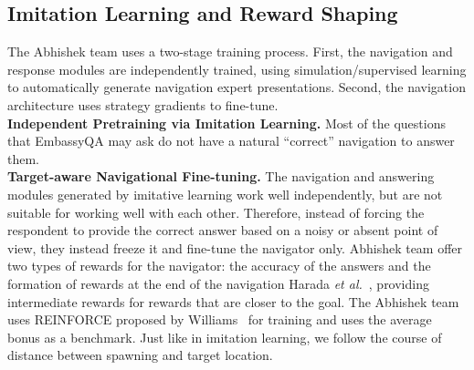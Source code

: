 \documentclass[10pt,twocolumn,letterpaper]{article}
\begin{document}
        \subsection{Imitation Learning and Reward Shaping}
        The Abhishek team uses a two-stage training process. First, the navigation and response modules are independently trained, using simulation/supervised learning to automatically generate navigation expert presentations. Second, the navigation architecture uses strategy gradients to fine-tune. \\
        \textbf{Independent Pretraining via Imitation Learning.} Most of the questions that EmbassyQA may ask do not have a natural ``correct'' navigation to answer them. \\
        \textbf{Target-aware Navigational Fine-tuning.} The navigation and answering modules generated by imitative learning work well independently, but are not suitable for working well with each other. Therefore, instead of forcing the respondent to provide the correct answer based on a noisy or absent point of view, they instead freeze it and fine-tune the navigator only. Abhishek team offer two types of rewards for the navigator: the accuracy of the answers and the formation of rewards at the end of the navigation Harada \emph{et al.}~\cite{[5]}, providing intermediate rewards for rewards that are closer to the goal. The Abhishek team uses REINFORCE proposed by Williams~\cite{[40]} for training and uses the average bonus as a benchmark. Just like in imitation learning, we follow the course of distance between spawning and target location.


{
\small


}
\end{document}
